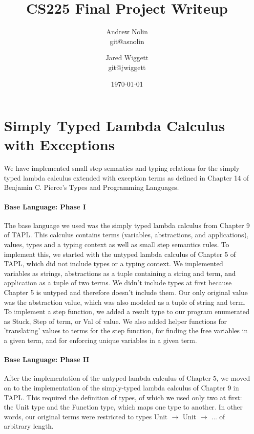 \documentclass{article}
\title{CS225 Final Project Writeup}
\author{Andrew Nolin \\ git@asnolin \and Jared Wiggett \\ git@jwiggett}
\date{\today}
\begin{document}
\maketitle
\section*{Simply Typed Lambda Calculus with Exceptions}
We have implemented small step semantics and typing relations for the simply typed lambda calculus extended with exception terms as defined in Chapter 14 of Benjamin C. Pierce's Types and Programming Languages.

\paragraph{Base Language: Phase I}
The base language we used was the simply typed lambda calculus from Chapter 9 of TAPL. This calculus contains terms (variables, abstractions, and applications), values, types and a typing context as well as small step semantics rules. To implement this, we started with the untyped lambda calculus of Chapter 5 of TAPL, which did not include types or a typing context. We implemented variables as strings, abstractions as a tuple containing a string and term, and application as a tuple of two terms. We didn't include types at first because Chapter 5 is untyped and therefore doesn't include them. Our only original value was the abstraction value, which was also modeled as a tuple of string and term. To implement a step function, we added a result type to our program enumerated as Stuck, Step of term, or Val of value. We also added helper functions for 'translating' values to terms for the step function, for finding the free variables in a given term, and for enforcing unique variables in a given term.
\paragraph{Base Language: Phase II}
After the implementation of the untyped lambda calculus of Chapter 5, we moved on to the implementation of the simply-typed lambda calculus of Chapter 9 in TAPL. This required the definition of types, of which we used only two at first: the Unit type and the Function type, which maps one type to another. In other words, our original terms were restricted to types Unit \(\rightarrow\) Unit \(\rightarrow\) ... of arbitrary length.
\end{document}
